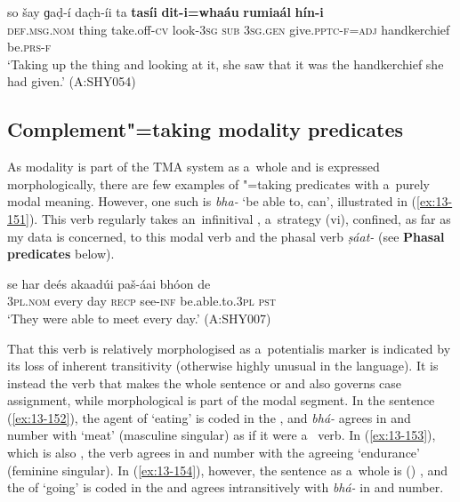 \begin{exe}
\ex
\label{ex:13-150}
\gll so šay ɡaḍ-í dac̣h-íi ta \textbf{tasíi} \textbf{dit-i=whaáu} \textbf{rumiaál} \textbf{hín-i}\\
\textsc{def.msg.nom} thing take.off-\textsc{cv} look-\textsc{3sg} \textsc{sub} \textsc{3sg.gen} give.\textsc{pptc-f}=\textsc{adj} handkerchief be.\textsc{prs-f}\\
\glt `Taking up the thing and looking at it, she saw that it was the handkerchief she had given.' (A:SHY054)
\end{exe}

\subsection{Complement"=taking modality predicates}
\label{subsec:13-5-2}

 As modality is part of the TMA system as a~whole and is expressed morphologically, there are few examples of "=taking predicates with a~purely modal meaning. However, one such  is \textit{bha-} `be able to, can', illustrated in (\ref{ex:13-151}). This verb regularly takes an~infinitival , a~strategy (vi), confined, as far as my data is concerned, to this modal verb and the phasal verb \textit{ṣáat-} (see \textbf{Phasal predicates} below).

\begin{exe}
\ex
\label{ex:13-151}
\gll se har deés akaadúi paš-áai bhóon de\\
\textsc{3pl.nom} every day \textsc{recp} see-\textsc{inf} be.able.to.\textsc{3pl} \textsc{pst}\\
\glt `They were able to meet every day.' (A:SHY007) 
\end{exe}

That this verb is relatively morphologised as a~potentialis marker is indicated by its loss of inherent transitivity (otherwise highly unusual in the language). It is instead the  verb that makes the whole sentence  or  and also governs case assignment, while morphological  is part of the modal segment. In the   sentence (\ref{ex:13-152}), the agent of `eating' is coded in the , and \textit{bhá-} agrees in  and number with `meat' (masculine singular) as if it were a~ verb. In (\ref{ex:13-153}), which is also  , the verb agrees in  and number with the agreeing  `endurance' (feminine singular). In (\ref{ex:13-154}), however, the sentence as a~whole is () , and the  of `going' is coded in the  and agrees intransitively with \textit{bhá-} in  and number.

